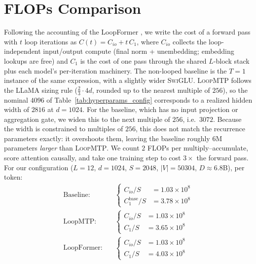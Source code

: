 




\section{FLOPs Comparison}
\label{sec:flops}




Following the accounting of the LoopFormer \cite{jeddi2026loopformer}, we write the cost of a
forward pass with $t$ loop iterations as $C(t) = C_{io} + t\, C_1$, where
$C_{io}$ collects the loop-independent input/output compute (final norm + unembedding;
embedding lookups are free) and $C_1$ is the cost of one pass through the shared
$L$-block stack plus each model's per-iteration machinery. 
The non-looped baseline is the $T=1$ instance of the same expression, with a slightly wider \textsc{SwiGLU}. \textsc{LoopMTP} follows the LLaMA sizing rule ($\tfrac{2}{3}\cdot 4d$, rounded up to the nearest multiple of $256$), so the nominal $4096$ of Table~\ref{tab:hyperparams_config} corresponds to a realized hidden width of $2816$ at $d{=}1024$. For the baseline, which has no input projection or aggregation gate, we widen this to the next multiple of $256$, i.e.\ $3072$. Because the width is constrained to multiples of $256$, this does not match the recurrence parameters exactly: it overshoots them, leaving the baseline roughly $6$M parameters \emph{larger} than \textsc{LoopMTP}.
We count $2$ FLOPs per multiply--accumulate, score attention
causally, and take one training step to cost $3\times$ the forward pass.
For our configuration ($L=12$, $d=1024$, $S=2048$, $|V|=50304$, $D \approx 6.8$B), per token:
\begin{align*}
\text{Baseline:}\quad &
\left\{
\begin{aligned}
    C_{io}/S &= 1.03 \times 10^{8}\\ 
    C_1^{\mathrm{base}}/S &= 3.78 \times 10^{8}
\end{aligned}
\right. \\[7pt]
\text{LoopMTP:}\quad &
\left\{
\begin{aligned}
    C_{io}/S &= 1.03 \times 10^{8}\\
    C_1/S &= 3.65 \times 10^{8}
\end{aligned}
\right. \\[7pt]
\text{LoopFormer:}\quad &
\left\{
\begin{aligned}
    C_{io}/S &= 1.03 \times 10^{8}\\
    C_1/S &= 4.03 \times 10^{8}
\end{aligned}
\right.
\end{align*}

